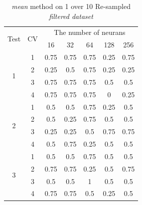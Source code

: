 \documentclass[draft,dvipsnames]{drexel-thesis}
\begin{document}
\begin{thesis}
\begin{table}[!t]
\centering
\caption{{\em mean} method on 1 over 10 Re-sampled {\em filtered dataset}}
\label{tbl:mean_1_10}
\begin{tabular}{|c|c|c|c|c|c|c|}
\hline
\multirow{2}{*}{Test} & \multirow{2}{*}{CV} & \multicolumn{5}{c|}{The number of neurans}                               \\ \cline{3-7} 
                      &                     & 16           & 32           & 64           & 128          & 256          \\ \hline
\multirow{4}{*}{1}    & 1                   & 0.75         & 0.75         & 0.75         & 0.25         & 0.75         \\ \cline{2-7} 
                      & 2                   & 0.25         & 0.5          & 0.75         & 0.25         & 0.25         \\ \cline{2-7} 
                      & 3                   & 0.75         & 0.75         & 0.75         & 0.5          & 0.5          \\ \cline{2-7} 
                      & 4                   & 0.75         & 0.75         & 0.75         & 0            & 0.25         \\ \hline
\multirow{4}{*}{2}    & 1                   & 0.5          & 0.5          & 0.75         & 0.25         & 0.5          \\ \cline{2-7} 
                      & 2                   & 0.5          & 0.25         & 0.75         & 0.5          & 0.5          \\ \cline{2-7} 
                      & 3                   & 0.25         & 0.25         & 0.5          & 0.75         & 0.75         \\ \cline{2-7} 
                      & 4                   & 0.5          & 0.75         & 0.25         & 0.5          & 0.5          \\ \hline
\multirow{4}{*}{3}    & 1                   & 0.5          & 0.5          & 0.75         & 0.5          & 0.5          \\ \cline{2-7} 
                      & 2                   & 0.75         & 0.75         & 0.25         & 0.5          & 0.75         \\ \cline{2-7} 
                      & 3                   & 0.5          & 0.5          & 1            & 0.5          & 0.5          \\ \cline{2-7} 
                      & 4                   & 0.75         & 0.75         & 0.5          & 0.25         & 0.5          \\ \hline

\end{tabular}
\end{table}
\end{thesis}
\end{document}
